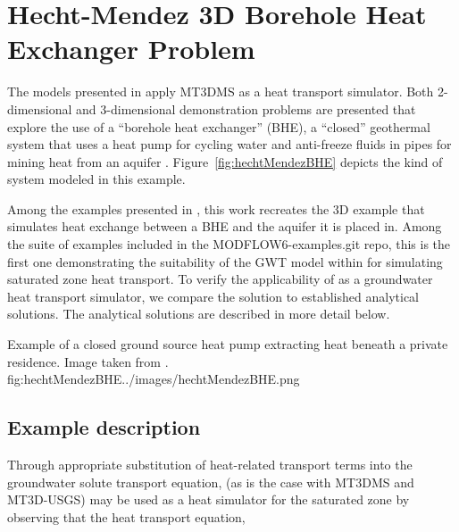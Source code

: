 \section{Hecht-Mendez 3D Borehole Heat Exchanger Problem}

The models presented in \cite{hechtMendez2010} apply MT3DMS \citep{zheng1999mt3dms} as a heat transport simulator.  Both 2-dimensional and 3-dimensional demonstration problems are presented that explore the use of a ``borehole heat exchanger'' (BHE), a ``closed'' geothermal system that uses a heat pump for cycling water and anti-freeze fluids in pipes for mining heat from an aquifer \citep{diao2004}.  Figure~\ref{fig:hechtMendezBHE} depicts the kind of system modeled in this example.  

Among the examples presented in \cite{hechtMendez2010}, this work recreates the 3D example that simulates heat exchange between a BHE and the aquifer it is placed in.  Among the suite of examples included in the MODFLOW6-examples.git repo, this is the first one demonstrating the suitability of the GWT model within \mf for simulating saturated zone heat transport.  To verify the applicability of  as a groundwater heat transport simulator, we compare the \mf solution to established analytical solutions.  The analytical solutions are described in more detail below.

\begin{StandardFigure}{
                                     Example of a closed ground source heat pump extracting heat beneath a private residence.  Image taken from \cite{hecht2008}.
                                     }{fig:hechtMendezBHE}{../images/hechtMendezBHE.png}
\end{StandardFigure}       

\subsection{Example description}

Through appropriate substitution of heat-related transport terms into the groundwater solute transport equation, \mf (as is the case with MT3DMS and MT3D-USGS) may be used as a heat simulator for the saturated zone by observing that the heat transport equation, 
